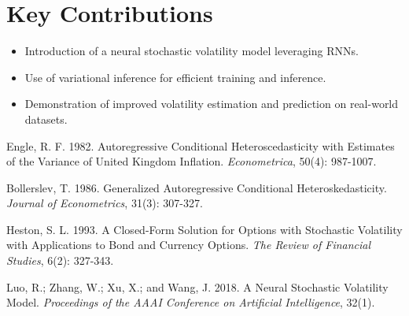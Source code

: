 \documentclass[letterpaper, 11pt]{article}
\begin{document}
\section{Key Contributions}
\begin{itemize}
    \item Introduction of a neural stochastic volatility model leveraging RNNs.
    \item Use of variational inference for efficient training and inference.
    \item Demonstration of improved volatility estimation and prediction on real-world datasets.
\end{itemize}

\begin{thebibliography}{}
Engle, R. F. 1982. Autoregressive Conditional Heteroscedasticity with Estimates of the Variance of United Kingdom Inflation. \emph{Econometrica}, 50(4): 987-1007.

Bollerslev, T. 1986. Generalized Autoregressive Conditional Heteroskedasticity. \emph{Journal of Econometrics}, 31(3): 307-327.

Heston, S. L. 1993. A Closed-Form Solution for Options with Stochastic Volatility with Applications to Bond and Currency Options. \emph{The Review of Financial Studies}, 6(2): 327-343.

Luo, R.; Zhang, W.; Xu, X.; and Wang, J. 2018. A Neural Stochastic Volatility Model. \emph{Proceedings of the AAAI Conference on Artificial Intelligence}, 32(1).
\end{thebibliography}
\end{document}
